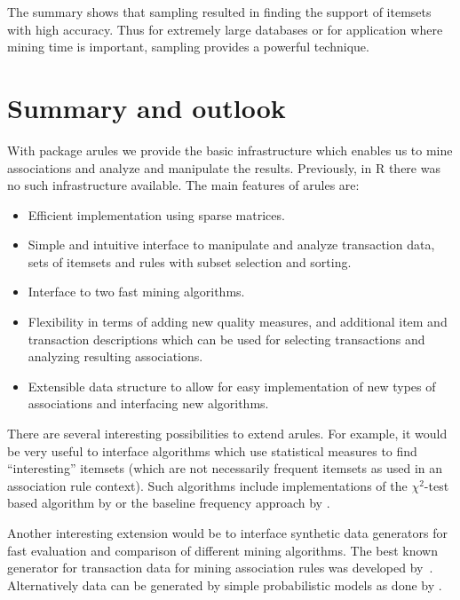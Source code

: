 \documentclass[10pt,a4paper]{article}
\newcommand{\strong}[1]{{\normalfont\fontseries{b}\selectfont #1}}
\newcommand{\pkg}[1]{\strong{#1}}
\newcommand{\proglang}[1]{\textsf{#1}}
\begin{document}
The summary shows that sampling resulted in finding the support of itemsets
with high accuracy. Thus for extremely large databases or
for application where mining time is important, sampling provides
a powerful technique.



\section{Summary and outlook\label{sec:conclusion}}

With package \pkg{arules} we
provide the basic infrastructure which enables us to 
mine associations and analyze and manipulate the results. 
Previously, in \proglang{R} there was no such infrastructure available.
The main features of \pkg{arules} are:

\begin{itemize}
 \item Efficient implementation using sparse matrices.
 \item Simple and intuitive interface to manipulate and analyze
  transaction data, sets of itemsets and rules with subset selection and
  sorting.
 \item Interface to two fast mining algorithms.
 \item Flexibility in terms of adding new quality measures, and
  additional item and transaction descriptions which can be used for
  selecting transactions and analyzing resulting associations.
 \item Extensible data structure to allow for easy implementation of new
  types of associations and interfacing new algorithms.
\end{itemize}

There are several interesting possibilities to extend \pkg{arules}.  For
example, it would be very useful to interface algorithms which use
statistical measures to find ``interesting'' itemsets (which are not
necessarily frequent itemsets as used in an association rule context).
Such algorithms include implementations of the $\chi^2$-test based
algorithm by \cite{arules:Silverstein+Brin+Motwani:1998} or the baseline
frequency approach by \cite{arules:DuMouchel+Pregibon2001}.

Another interesting extension would be to interface synthetic data 
generators for fast evaluation and comparison of different mining algorithms.
The best known generator for
transaction data for mining association rules
was developed by~\cite{arules:Agrawal+Srikant:1994}.
Alternatively data can be generated by simple probabilistic models 
as done by
\cite{arules:Hahsler+Hornik+Reutterer:2005}.
\end{document}
